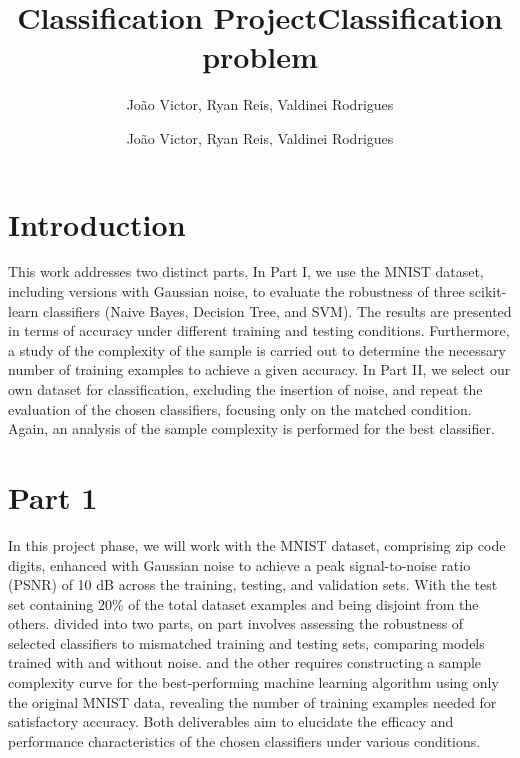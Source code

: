 \documentclass{sbrt}
\begin{document}
\title{Classification Project}
\author{João Victor, Ryan Reis, Valdinei Rodrigues}

\maketitle




\title{Classification problem}
\author{João Victor, Ryan Reis, Valdinei Rodrigues}


\section{Introduction}
This work addresses two distinct parts. In Part I, we use the MNIST dataset, including versions with Gaussian noise, to evaluate the robustness of three scikit-learn classifiers (Naive Bayes, Decision Tree, and SVM). The results are presented in terms of accuracy under different training and testing conditions. Furthermore, a study of the complexity of the sample is carried out to determine the necessary number of training examples to achieve a given accuracy. In Part II, we select our own dataset for classification, excluding the insertion of noise, and repeat the evaluation of the chosen classifiers, focusing only on the matched condition. Again, an analysis of the sample complexity is performed for the best classifier.



\section{Part 1}

In this project phase, we will work with the MNIST dataset, comprising zip code digits, enhanced with Gaussian noise to achieve a peak signal-to-noise ratio (PSNR) of 10 dB across the training, testing, and validation sets. With the test set containing 20\% of the total dataset examples and being disjoint from the others. divided into two parts, on part involves assessing the robustness of selected classifiers to mismatched training and testing sets, comparing models trained with and without noise. and the other requires constructing a sample complexity curve for the best-performing machine learning algorithm using only the original MNIST data, revealing the number of training examples needed for satisfactory accuracy. Both deliverables aim to elucidate the efficacy and performance characteristics of the chosen classifiers under various conditions.
\end{document}
